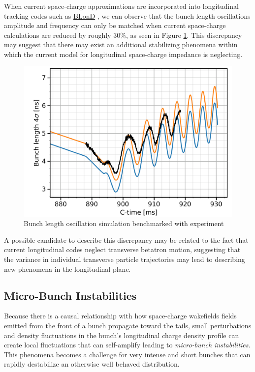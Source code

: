 When current space-charge approximations are incorporated into longitudinal tracking codes such as \href{https://blond.web.cern.ch/}{BLonD} \cite{noauthor_cern_nodate}, we can observe that the bunch length oscillations amplitude and frequency can only be matched when current space-charge calculations are reduced by roughly 30\%, as seen in Figure \ref{fig:BlonD_v_experiment}. This discrepancy may suggest that there may exist an additional stabilizing phenomena within which the current model for longitudinal space-charge impedance is neglecting.

\begin{figure}
    \centering
    \includegraphics{figs/simulation_v_experiment.png}
    \caption{Bunch length oscillation simulation benchmarked with experiment}
    \label{fig:BlonD_v_experiment}
\end{figure}

A possible candidate to describe this discrepancy may be related to the fact that current longitudinal codes neglect transverse betatron motion, suggesting that the variance in individual transverse particle trajectories may lead to describing new phenomena in the longitudinal plane.

\subsection{Micro-Bunch Instabilities}

Because there is a causal relationship with how space-charge wakefields fields emitted from the front of a bunch propagate toward the tails, small perturbations and density fluctuations in the bunch's longitudinal charge density profile can create local fluctuations that can self-amplify leading to \textit{micro-bunch instabilities}. This phenomena becomes a challenge for very intense and short bunches that can rapidly destabilize an otherwise well behaved distribution.

